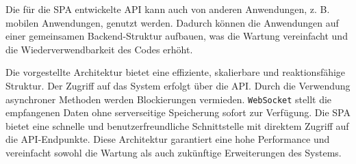 \documentclass[12pt, letterpaper]{article}
\begin{document}
\par Die für die SPA entwickelte API kann auch von anderen Anwendungen, z. B. mobilen Anwendungen, genutzt werden. Dadurch können die Anwendungen auf einer gemeinsamen Backend-Struktur aufbauen, was die Wartung vereinfacht und die Wiederverwendbarkeit des Codes erhöht.
\par Die vorgestellte Architektur bietet eine effiziente, skalierbare und reaktionsfähige Struktur. Der Zugriff auf das System erfolgt über die API. Durch die Verwendung asynchroner Methoden werden Blockierungen vermieden. \texttt{WebSocket} stellt die empfangenen Daten ohne serverseitige Speicherung sofort zur Verfügung. Die SPA bietet eine schnelle und benutzerfreundliche Schnittstelle mit direktem Zugriff auf die API-Endpunkte. Diese Architektur garantiert eine hohe Performance und vereinfacht sowohl die Wartung als auch zukünftige Erweiterungen des Systems.
\end{document}
